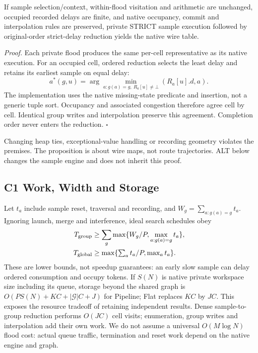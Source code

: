 \begin{proposition}
If sample selection/context, within-flood visitation and arithmetic are unchanged, occupied recorded delays are finite, and native occupancy, commit and interpolation rules are preserved, private STRICT sample execution followed by original-order strict-delay reduction yields the native wire table.
\end{proposition}
\noindent\emph{Proof.} Each private flood produces the same per-cell representative as its native execution. For an occupied cell, ordered reduction selects the least delay and retains its earliest sample on equal delay:
\begin{equation}
 a^*(g,u)=\arg\min_{a:g(a)=g,\ R_a[u]\ne\bot}(R_a[u].d,a).
\end{equation}
The implementation uses the native missing-state predicate and insertion, not a generic tuple sort. Occupancy and associated congestion therefore agree cell by cell. Identical group writes and interpolation preserve this agreement. Completion order never enters the reduction. $\square$

Changing heap ties, exceptional-value handling or recording geometry violates the premises. The proposition is about wire maps, not route trajectories. ALT below changes the sample engine and does not inherit this proof.

\subsection{C1 Work, Width and Storage}
Let $t_a$ include sample reset, traversal and recording, and $W_g=\sum_{a:g(a)=g}t_a$. Ignoring launch, merge and interference, ideal search schedules obey
\begin{align}
 T_{\rm group}&\geq\sum_g\max\{W_g/P,\max_{a:g(a)=g}t_a\},\\
 T_{\rm global}&\geq\max\{\textstyle\sum_a t_a/P,\max_a t_a\}.
\end{align}
These are lower bounds, not speedup guarantees: an early slow sample can delay ordered consumption and occupy tokens. If $S(N)$ is native private workspace size including its queue, storage beyond the shared graph is $O(P S(N)+KC+|\mathcal G|C+J)$ for Pipeline; Flat replaces $KC$ by $JC$. This exposes the resource tradeoff of retaining independent results. Dense sample-to-group reduction performs $O(JC)$ cell visits; enumeration, group writes and interpolation add their own work. We do not assume a universal $O(M\log N)$ flood cost: actual queue traffic, termination and reset work depend on the native engine and graph.

